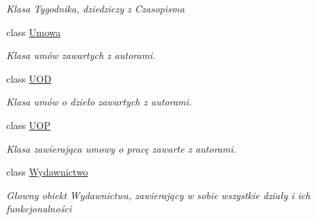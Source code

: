 \begin{DoxyCompactItemize}
\begin{DoxyCompactList}\small\item\em Klasa Tygodnika, dziedziczy z Czasopisma \end{DoxyCompactList}\item 
class \mbox{\hyperlink{class_projekt1_1_1_umowa}{Umowa}}
\begin{DoxyCompactList}\small\item\em Klasa umów zawartych z autorami. \end{DoxyCompactList}\item 
class \mbox{\hyperlink{class_projekt1_1_1_u_o_d}{U\+OD}}
\begin{DoxyCompactList}\small\item\em Klasa umów o dzieło zawartych z autorami. \end{DoxyCompactList}\item 
class \mbox{\hyperlink{class_projekt1_1_1_u_o_p}{U\+OP}}
\begin{DoxyCompactList}\small\item\em Klasa zawierająca umowy o pracę zawarte z autorami. \end{DoxyCompactList}\item 
class \mbox{\hyperlink{class_projekt1_1_1_wydawnictwo}{Wydawnictwo}}
\begin{DoxyCompactList}\small\item\em Głowny obiekt Wydawnictwa, zawierający w sobie wszystkie działy i ich funkcjonalności \end{DoxyCompactList}\end{DoxyCompactItemize}
